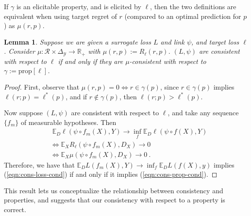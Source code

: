 \documentclass{article}
\newcommand{\reals}{\mathbb{R}}
\newcommand{\simplex}{\Delta_\Y}
\newcommand{\prop}[1]{\mathrm{prop}[#1]}
\newcommand{\propdis}{\mu}
\newcommand{\E}{\mathbb{E}}
\newcommand{\R}{\mathcal{R}}
\newcommand{\Y}{\mathcal{Y}}
\newcommand{\risk}[1]{#1^*}
\newtheorem{lemma}{Lemma}
\begin{document}

If $\gamma$ is an elicitable property, and is elicited by $\ell$, then the two definitions are equivalent when using target regret of $r$ (compared to an optimal prediction for $p$) as $\propdis(r,p)$.
\begin{lemma}\label{lem:consistent-loss-implies-prop}
	Suppose we are given a surrogate loss $L$ and link $\psi$, and target loss $\ell$.
	Consider $\propdis: \R \times \simplex \to \reals_+$ with $\mu(r,p) := R_\ell(r,p)$.
	$(L, \psi)$ are consistent with respect to $\ell$ if and only if they are $\propdis$-consistent with respect to $\gamma := \prop{\ell}$.
\end{lemma}
\begin{proof}
	First, observe that $\propdis(r,p) = 0 \iff r \in \gamma(p)$, since $r \in \gamma(p)$ implies $\ell(r;p) = \risk{\ell}(p)$, and if $r \not \in \gamma(p)$, then $\ell(r;p) > \risk{\ell}(p)$.
	
	Now suppose $(L, \psi)$ are consistent with respect to $\ell$, and take any sequence $\{f_m\}$ of measurable hypotheses.
        Then
        \begin{align}
	  &\; \E_D \ell(\psi \circ f_m(X), Y)\to \inf_f \E_D \ell(\psi \circ f(X), Y)   \label{eqn:cons-loss-cond} \\
	  &\iff \E_X R_\ell(\psi \circ f_m(X), D_X) \to 0                               \nonumber  \\
	  &\iff \E_X \propdis(\psi \circ f_m(X), D_X) \to 0~.~                          \label{eqn:cons-prop-cond}
	\end{align}
        Therefore, we have that $\mathbb{E}_D L(f_m(X),Y) \to \inf_f \mathbb{E}_D L(f(X),y)$ implies (\ref{eqn:cons-loss-cond}) if and only if it implies (\ref{eqn:cons-prop-cond}).
\end{proof}

This result lets us conceptualize the relationship between consistency and properties, and suggests that our consistency with respect to a property is correct.
\end{document}
